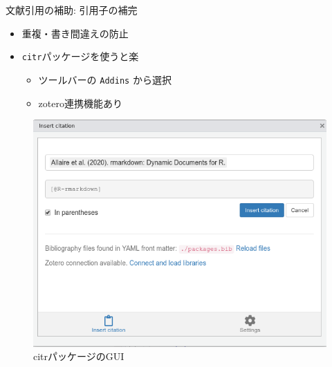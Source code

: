 \documentclass[
  12pt,
  ignorenonframetext,
]{beamer}
\providecommand{\tightlist}{%
  \setlength{\itemsep}{0pt}\setlength{\parskip}{0pt}}
\begin{document}
\begin{frame}[fragile]{文献引用の補助: 引用子の補完}
\protect\hypertarget{ux6587ux732eux5f15ux7528ux306eux88dcux52a9-ux5f15ux7528ux5b50ux306eux88dcux5b8c}{}

\begin{itemize}
\tightlist
\item
  重複・書き間違えの防止
\item
  \texttt{citr}パッケージを使うと楽

  \begin{itemize}
  \tightlist
  \item
    ツールバーの \texttt{Addins} から選択
  \item
    zotero連携機能あり
  \end{itemize}
\end{itemize}

\begin{figure}

{\centering \includegraphics[width=1\linewidth]{img/citr} 

}

\caption{citrパッケージのGUI}\label{fig:citr-image}
\end{figure}

\end{frame}
\end{document}
